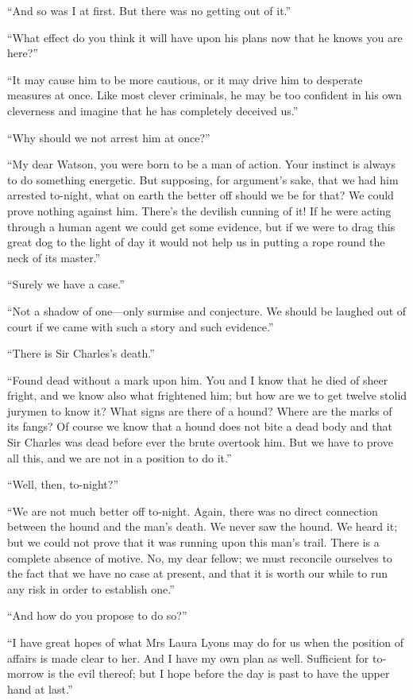 \documentclass[paper=5.5in:8.5in,BCOR=7mm,twoside,DIV=calc,12pt,usegeometry,openany,chapterprefix,endperiod,headings=big]{scrbook} %
\begin{document}
\enquote{And so was I at first. But there was no getting out of it.}

\enquote{What effect do you think it will have upon his plans now that he knows you are here?}

\enquote{It may cause him to be more cautious, or it may drive him to desperate measures at once. Like most clever criminals, he may be too confident in his own cleverness and imagine that he has completely deceived us.}

\enquote{Why should we not arrest him at once?}

\enquote{My dear Watson, you were born to be a man of action. Your instinct is always to do something energetic. But supposing, for argument's sake, that we had him arrested to-night, what on earth the better off should we be for that? We could prove nothing against him. There's the devilish cunning of it! If he were acting through a human agent we could get some evidence, but if we were to drag this great dog to the light of day it would not help us in putting a rope round the neck of its master.}

\enquote{Surely we have a case.}

\enquote{Not a shadow of one---only surmise and conjecture. We should be laughed out of court if we came with such a story and such evidence.}

\enquote{There is Sir Charles's death.}

\enquote{Found dead without a mark upon him. You and I know that he died of sheer fright, and we know also what frightened him; but how are we to get twelve stolid jurymen to know it? What signs are there of a hound? Where are the marks of its fangs? Of course we know that a hound does not bite a dead body and that Sir Charles was dead before ever the brute overtook him. But we have to prove all this, and we are not in a position to do it.}

\enquote{Well, then, to-night?}

\enquote{We are not much better off to-night. Again, there was no direct connection between the hound and the man's death. We never saw the hound. We heard it; but we could not prove that it was running upon this man's trail. There is a complete absence of motive. No, my dear fellow; we must reconcile ourselves to the fact that we have no case at present, and that it is worth our while to run any risk in order to establish one.}

\enquote{And how do you propose to do so?}

\enquote{I have great hopes of what Mrs Laura Lyons may do for us when the position of affairs is made clear to her. And I have my own plan as well. Sufficient for to-morrow is the evil thereof; but I hope before the day is past to have the upper hand at last.}
\end{document}
